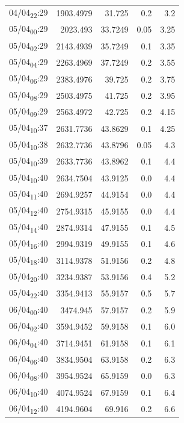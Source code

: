 \documentclass[11pt]{article}
\begin{document}
\begin{center}
\begin{tabular}{lrrrr}
04/04\textsubscript{22}:29 & 1903.4979 & 31.725 & 0.2 & 3.2\\[0pt]
05/04\textsubscript{00}:29 & 2023.493 & 33.7249 & 0.05 & 3.25\\[0pt]
05/04\textsubscript{02}:29 & 2143.4939 & 35.7249 & 0.1 & 3.35\\[0pt]
05/04\textsubscript{04}:29 & 2263.4969 & 37.7249 & 0.2 & 3.55\\[0pt]
05/04\textsubscript{06}:29 & 2383.4976 & 39.725 & 0.2 & 3.75\\[0pt]
05/04\textsubscript{08}:29 & 2503.4975 & 41.725 & 0.2 & 3.95\\[0pt]
05/04\textsubscript{09}:29 & 2563.4972 & 42.725 & 0.2 & 4.15\\[0pt]
05/04\textsubscript{10}:37 & 2631.7736 & 43.8629 & 0.1 & 4.25\\[0pt]
05/04\textsubscript{10}:38 & 2632.7736 & 43.8796 & 0.05 & 4.3\\[0pt]
05/04\textsubscript{10}:39 & 2633.7736 & 43.8962 & 0.1 & 4.4\\[0pt]
05/04\textsubscript{10}:40 & 2634.7504 & 43.9125 & 0.0 & 4.4\\[0pt]
05/04\textsubscript{11}:40 & 2694.9257 & 44.9154 & 0.0 & 4.4\\[0pt]
05/04\textsubscript{12}:40 & 2754.9315 & 45.9155 & 0.0 & 4.4\\[0pt]
05/04\textsubscript{14}:40 & 2874.9314 & 47.9155 & 0.1 & 4.5\\[0pt]
05/04\textsubscript{16}:40 & 2994.9319 & 49.9155 & 0.1 & 4.6\\[0pt]
05/04\textsubscript{18}:40 & 3114.9378 & 51.9156 & 0.2 & 4.8\\[0pt]
05/04\textsubscript{20}:40 & 3234.9387 & 53.9156 & 0.4 & 5.2\\[0pt]
05/04\textsubscript{22}:40 & 3354.9413 & 55.9157 & 0.5 & 5.7\\[0pt]
06/04\textsubscript{00}:40 & 3474.945 & 57.9157 & 0.2 & 5.9\\[0pt]
06/04\textsubscript{02}:40 & 3594.9452 & 59.9158 & 0.1 & 6.0\\[0pt]
06/04\textsubscript{04}:40 & 3714.9451 & 61.9158 & 0.1 & 6.1\\[0pt]
06/04\textsubscript{06}:40 & 3834.9504 & 63.9158 & 0.2 & 6.3\\[0pt]
06/04\textsubscript{08}:40 & 3954.9524 & 65.9159 & 0.0 & 6.3\\[0pt]
06/04\textsubscript{10}:40 & 4074.9524 & 67.9159 & 0.1 & 6.4\\[0pt]
06/04\textsubscript{12}:40 & 4194.9604 & 69.916 & 0.2 & 6.6\\[0pt]

\end{tabular}
\end{center}
\end{document}
